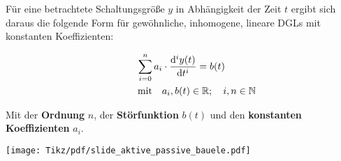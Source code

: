 \begin{frame}
{    Für eine betrachtete Schaltungsgröße $y$ in Abhängigkeit der Zeit $t$ ergibt sich daraus 
    die folgende Form für gewöhnliche, inhomogene, lineare DGLs mit konstanten Koeffizienten:

    \begin{align}\label{eq:grundlagen:dgl:inhomogen}
        \sum_{i=0}^{n} a_i \cdot \frac{\d^i y(t)}{\d t^i} &= b(t)\\\nonumber
        \mathclap{\text{mit} \quad a_i, b(t) \in \mathbb{R}; \quad i, n \in \mathbb{N}}
    \end{align}

    Mit der \textbf{Ordnung} $n$, 
    der \textbf{Störfunktion} $b(t)$ und den \textbf{konstanten Koeffizienten} $a_i$. 

}%
\b{%
    \centering%
    \texttt{[image: Tikz/pdf/slide\_aktive\_passive\_bauele.pdf]}
}%
\end{frame}


